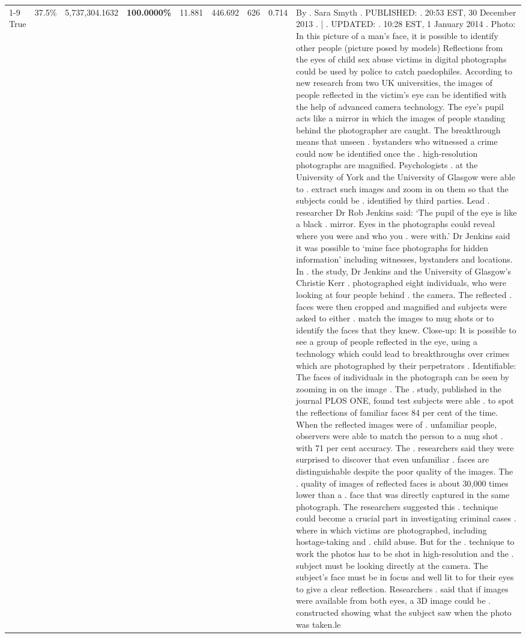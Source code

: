 \begin{table}[H]
\begin{tabular}{lllrlllll}
\cline{1-9}
True & 37.5\% & 5,737,304.1632 & \bfseries \color{red} 100.0000\% & 11.881 & 446.692 & 626 & 0.714 & By . Sara Smyth . PUBLISHED: . 20:53 EST, 30 December 2013 . | . UPDATED: . 10:28 EST, 1 January 2014 . Photo: In this picture of a man's face, it is possible to identify other people (picture posed by models) Reflections from the eyes of child sex abuse victims in digital photographs could be used by police to catch paedophiles. According to new research from two UK universities, the images of people reflected in the victim's eye can be identified with the help of advanced camera technology. The eye's pupil acts like a mirror in which the images of people standing behind the photographer are caught. The breakthrough means that unseen . bystanders who witnessed a crime could now be identified once the . high-resolution photographs are magnified. Psychologists . at the University of York and the University of Glasgow were able to . extract such images and zoom in on them so that the subjects could be . identified by third parties. Lead . researcher Dr Rob Jenkins said: ‘The pupil of the eye is like a black . mirror. Eyes in the photographs could reveal where you were and who you . were with.' Dr Jenkins said it was possible to ‘mine face photographs for hidden information' including witnesses, bystanders and locations. In . the study, Dr Jenkins and the University of Glasgow's Christie Kerr . photographed eight individuals, who were looking at four people behind . the camera. The reflected . faces were then cropped and magnified and subjects were asked to either . match the images to mug shots or to identify the faces that they knew. Close-up: It is possible to see a group of people reflected in the eye, using a technology which could lead to breakthroughs over crimes which are photographed by their perpetrators . Identifiable: The faces of individuals in the photograph can be seen by zooming in on the image . The . study, published in the journal PLOS ONE, found test subjects were able . to spot the reflections of familiar faces 84 per cent of the time. When the reflected images were of . unfamiliar people, observers were able to match the person to a mug shot . with 71 per cent accuracy. The . researchers said they were surprised to discover that even unfamiliar . faces are distinguishable despite the poor quality of the images. The . quality of images of reflected faces is about 30,000 times lower than a . face that was directly captured in the same photograph. The researchers suggested this . technique could become a crucial part in investigating criminal cases . where in which victims are photographed, including hostage-taking and . child abuse. But for the . technique to work the photos has to be shot in high-resolution and the . subject must be looking directly at the camera. The subject's face must be in focus and well lit to for their eyes to give a clear reflection. Researchers . said that if images were available from both eyes, a 3D image could be . constructed showing what the subject saw when the photo was taken.le \\

\end{tabular}
\end{table}
